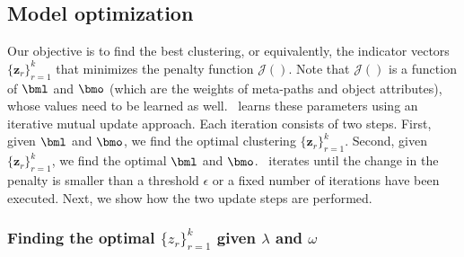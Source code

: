 \subsection{Model optimization}
\label{sec:optimization}

Our objective is to find the best clustering, or equivalently, the indicator vectors $\{\bm{z}_r\}_{r=1}^k$ that 
minimizes the penalty function $\mathcal{J}()$.
Note that $\mathcal{J}()$ is a function of $\bml$ and $\bmo$ (which are the weights of meta-paths and object
attributes), whose values need to be learned as well.
\schain\ learns these parameters using an iterative mutual update approach. 
Each iteration consists of two steps. First, given $\bml$ and $\bmo$, we find the optimal clustering 
$\{\bm{z}_r\}_{r=1}^k$. Second, given $\{\bm{z}_r\}_{r=1}^k$, we
find the optimal $\bml$ and $\bmo$.
\schain\ iterates until the change in the penalty is smaller than a threshold $\epsilon$ or 
a fixed number of iterations have been executed.
Next, we show how the two update steps are performed.

\subsubsection{Finding the optimal $\{${\boldmath $z$}$_r\}_{r=1}^k$ given {\boldmath $\lambda$} and \boldmath $\omega$}

